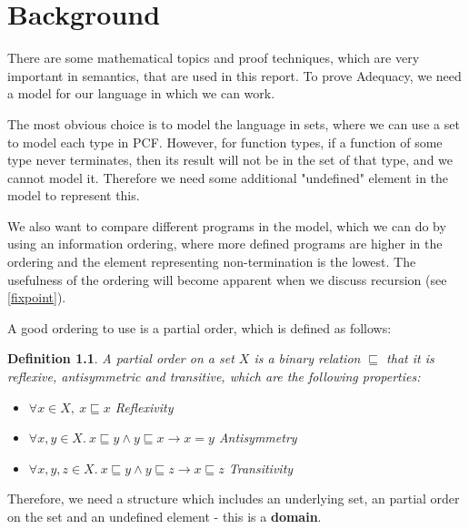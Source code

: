 \documentclass{bhamthesis}
\newtheorem{defn}{Definition}
\begin{document}
\chapter{Background}\label{ch2}
There are some mathematical topics and proof techniques, which are very important in semantics, that are used in this report. To prove Adequacy, we need a model for our language in which we can work.

The most obvious choice is to model the language in sets, where we can use a set to model each type in PCF. However, for function types, if a function of some type never terminates, then its result will not be in the set of that type, and we cannot model it. Therefore we need some additional "undefined" element in the model to represent this.

We also want to compare different programs in the model, which we can do by using an information ordering, where more defined programs are higher in the ordering and the element representing non-termination is the lowest. The usefulness of the ordering will become apparent when we discuss recursion (see \ref{fixpoint}).

A good ordering to use is a partial order, which is defined as follows:

\vspace{0.25cm}

\begin{defn}
A partial order on a set $X$ is a binary relation $\sqsubseteq$  that it is reflexive, antisymmetric and transitive, which are the following properties:
\begin{itemize}
      \item{$\forall x \in X, \ x \sqsubseteq x$ \hspace{4.5cm} Reflexivity}
      \item{$\forall x, y \in X. \  x \sqsubseteq y \wedge y \sqsubseteq x \to x = y$ \hspace{1cm} Antisymmetry}
      \item{$\forall x, y, z \in X. \ x \sqsubseteq y \wedge y \sqsubseteq z \to x \sqsubseteq z$ \hspace{1cm} Transitivity}
\end{itemize} 
\end{defn}


Therefore, we need a structure which includes an underlying set, an partial order on the set and an undefined element - this is a \textbf{domain}.
 
\end{document}
